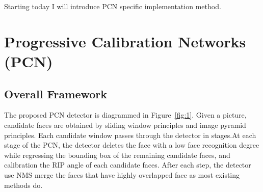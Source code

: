\documentclass{article}
\begin{document}
\begin{multicols}{2}
Starting today I will introduce PCN specific implementation method.
\section{Progressive Calibration Networks (PCN)}
\subsection{Overall Framework}
The proposed PCN detector is diagrammed in Figure~\ref{fig:1}. Given a picture, candidate faces are obtained by sliding window principles and image pyramid principles. Each candidate window passes through the detector in stages.At each stage of the PCN, the detector deletes the face with a low face recognition degree while regressing the bounding box of the remaining candidate faces, and calibration the RIP angle of each candidate faces. After each step, the detector use NMS merge the faces that have highly overlapped face as most existing methods do.

\end{multicols}
\end{document}
